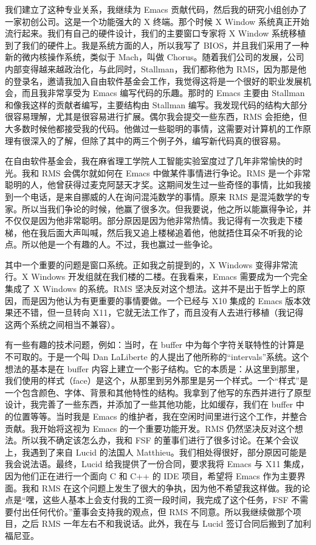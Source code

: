 \documentclass[format=acmsmall,screen]{acmart}
\begin{document}
我们建立了这种专业关系，我继续为 Emacs 贡献代码，然后我的研究小组创办了一家初创公司。这是一个功能强大的 X 终端。那个时候 X Window 系统真正开始流行起来。我们有自己的硬件设计，我们的主要窗口专家将 X Window 系统移植到了我们的硬件上。我是系统方面的人，所以我写了 BIOS，并且我们采用了一种新的微内核操作系统，类似于 Mach，叫做 Chorus。随着我们公司的发展，公司内部变得越来越政治化，与此同时，Stallman，我们都称他为 RMS，因为那是他的登录名，邀请我加入自由软件基金会工作，我觉得这将是一个很好的职业发展机会，而且我非常享受为 Emacs 编写代码的乐趣。那时的 Emacs 主要由 Stallman 和像我这样的贡献者编写，主要结构由 Stallman 编写。我发现代码的结构大部分很容易理解，尤其是很容易进行扩展。偶尔我会提交一些东西，RMS 会拒绝，但大多数时候他都接受我的代码。他做过一些聪明的事情，这需要对计算机的工作原理有很深入的了解，但除了其中的两三个例子外，编写新代码真的很容易。

在自由软件基金会，我在麻省理工学院人工智能实验室度过了几年非常愉快的时光。我和 RMS 会偶尔就如何在 Emacs 中做某件事情进行争论。RMS 是一个非常聪明的人，他曾获得过麦克阿瑟天才奖。这期间发生过一些奇怪的事情，比如我接到一个电话，是来自挪威的人在询问混沌数学的事情。原来 RMS 是混沌数学的专家。所以当我们争论的时候，他赢了很多次。但我要说，他之所以能赢得争论，并不仅仅是因为他非常聪明。部分原因是因为他非常热情。我记得有一次我走下楼梯，他在我后面大声叫喊，然后我又追上楼梯追着他，他就捂住耳朵不听我的论点。所以他是一个有趣的人。不过，我也赢过一些争论。

其中一个重要的问题是窗口系统。正如我之前提到的，X Windows 变得非常流行。X Windows 开发组就在我们楼的二楼。在我看来，Emacs 需要成为一个完全集成了 X Windows 的系统。RMS 坚决反对这个想法。这并不是出于哲学上的原因，而是因为他认为有更重要的事情要做。一个已经与 X10 集成的 Emacs 版本效果还不错，但一旦转向 X11，它就无法工作了，而且没有人去进行移植（我记得这两个系统之间相当不兼容）。

有一些有趣的技术问题，例如：当时，在 buffer 中为每个字符关联特性的计算是不可取的。于是一个叫 Dan LaLiberte 的人提出了他所称的“intervals”系统。这个想法的基本是在 buffer 内容上建立一个影子结构。它的本质是：从这里到那里，我们使用的样式（face）是这个，从那里到另外那里是另一个样式。一个“样式”是一个包含颜色、字体、背景和其他特性的结构。我拿到了他写的东西并进行了原型设计，我完善了一些东西，并添加了一些其他功能，比如缓存，我们在 buffer 中的位置等等。当时我是 Emacs 的维护者，我在空闲时间里进行这个工作，并整合贡献。我开始将这视为 Emacs 的一个重要功能开发。RMS 仍然坚决反对这个想法。所以我不确定该怎么办，我和 FSF 的董事们进行了很多讨论。在某个会议上，我遇到了来自 Lucid 的法国人 Matthieu。我们相处得很好，部分原因可能是我会说法语。最终，Lucid 给我提供了一份合同，要求我将 Emacs 与 X11 集成，因为他们正在进行一个面向 C 和 C++ 的 IDE 项目，希望将 Emacs 作为主要界面。我和 RMS 在这个问题上发生了很大的争执，因为他不希望我这样做。我的论点是“嘿，这些人基本上会支付我的工资一段时间，我完成了这个任务，FSF 不需要付出任何代价。”董事会支持我的观点，但 RMS 不同意。所以我继续做那个项目，之后 RMS 一年左右不和我说话。此外，我在与 Lucid 签订合同后搬到了加利福尼亚。
\end{document}
